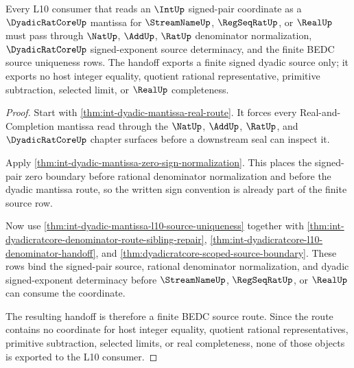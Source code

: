 \begin{theorem}
\label{thm:int-dyadic-real-mantissa-route}
Every L10 consumer that reads an $\IntUp$ signed-pair coordinate as a $\DyadicRatCoreUp$ mantissa for $\StreamNameUp$, $\RegSeqRatUp$, or $\RealUp$ must pass through $\NatUp$, $\AddUp$, $\RatUp$ denominator normalization, $\DyadicRatCoreUp$ signed-exponent source determinacy, and the finite BEDC source uniqueness rows. The handoff exports a finite signed dyadic source only; it exports no host integer equality, quotient rational representative, primitive subtraction, selected limit, or $\RealUp$ completeness.
\end{theorem}
\begin{proof}
Start with \autoref{thm:int-dyadic-mantissa-real-route}. It forces every Real-and-Completion mantissa read through the $\NatUp$, $\AddUp$, $\RatUp$, and $\DyadicRatCoreUp$ chapter surfaces before a downstream seal can inspect it.

Apply \autoref{thm:int-dyadic-mantissa-zero-sign-normalization}. This places the signed-pair zero boundary before rational denominator normalization and before the dyadic mantissa route, so the written sign convention is already part of the finite source row.

Now use \autoref{thm:int-dyadic-mantissa-l10-source-uniqueness} together with \autoref{thm:int-dyadicratcore-denominator-route-sibling-repair}, \autoref{thm:int-dyadicratcore-l10-denominator-handoff}, and \autoref{thm:dyadicratcore-scoped-source-boundary}. These rows bind the signed-pair source, rational denominator normalization, and dyadic signed-exponent determinacy before $\StreamNameUp$, $\RegSeqRatUp$, or $\RealUp$ can consume the coordinate.

The resulting handoff is therefore a finite BEDC source route. Since the route contains no coordinate for host integer equality, quotient rational representatives, primitive subtraction, selected limits, or real completeness, none of those objects is exported to the L10 consumer.
\end{proof}

